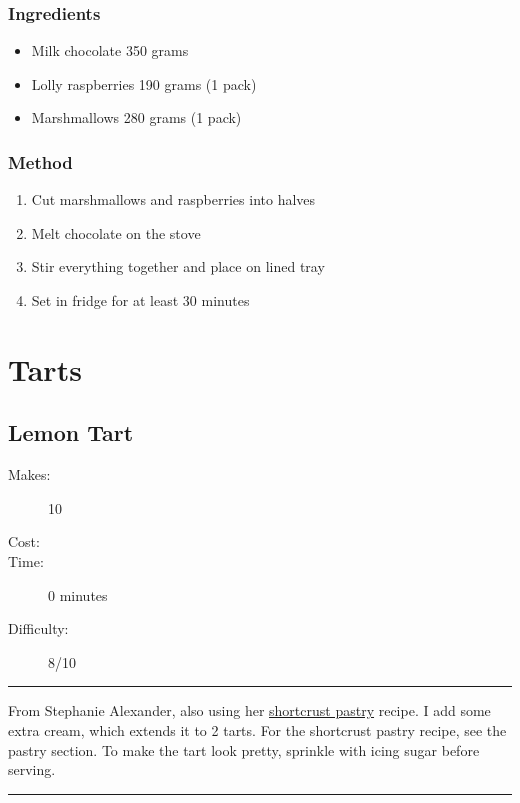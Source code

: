 \documentclass[]{article}
\begin{document}
\subsubsection*{\Large Ingredients}
\begin{multicols}{2}
\begin{itemize}
 \item Milk chocolate \hfill 350 grams
 \item Lolly raspberries \hfill 190 grams (1 pack)
 \item Marshmallows \hfill 280 grams (1 pack)
\end{itemize}
\end{multicols}
\subsubsection*{\Large Method}
\begin{enumerate}[font=\huge\color{accent}]
	\item Cut marshmallows and raspberries into halves
	\item Melt chocolate on the stove
	\item Stir everything together and place on lined tray
	\item Set in fridge for at least 30 minutes
\end{enumerate}
\newpage
{}
\section*{\center\Huge\color{accent}Tarts}
\label{cat:Tarts}
\label{rec:Lemon Tart}
\subsection*{\center\huge Lemon Tart}
\begin{description}
\item[Makes:] 10 
\item[Cost:] \textdollar
\item[Time:] 0 minutes
\item[Difficulty:] 8/10
\end{description}
\vspace{0.2cm}\hrule\vspace{0.5cm}
\begin{adjustwidth}{0.5 cm}{0.5 cm}

From Stephanie Alexander, also using her \hyperref[rec:Shortcrust Pastry]{shortcrust pastry} recipe. I add some extra cream, which extends it to 2 tarts. For the shortcrust pastry recipe, see the pastry section. To make the tart look pretty, sprinkle with icing sugar before serving. \hfill\color{accent}{\Large\faVimeoSquare\hspace{0.1cm}\faGlide\hspace{0.1cm}\faHeart\hspace{0.1cm}}\color{black}

\end{adjustwidth}
\vspace{0.5cm}\hrule
\end{document}
